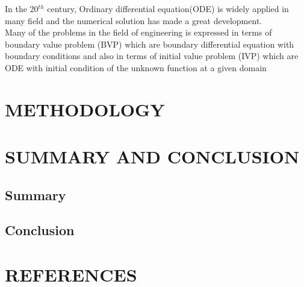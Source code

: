 \documentclass[11pt]{report}
\newcommand{\NI}{\noindent}
\begin{document}
	\NI In the 20$^{th}$ century, Ordinary differential equation(ODE) is widely applied in many field and the numerical solution has made a great development.\\
	
	\NI Many of the problems in the field of engineering is expressed in terms of boundary value problem (BVP) which are boundary differential equation with boundary conditions and also in terms of initial value problem (IVP) which are ODE with initial condition of the unknown function at a given domain 
	
	
	
	
	\chapter{METHODOLOGY}
	\section{}
	
	
	
	
	
	\chapter{}
	
	



	
	\chapter{SUMMARY AND CONCLUSION}
	\section{Summary}
	
	
	\section{Conclusion}
	
	

	
	\chapter*{REFERENCES}
	
	\begin{description}
		\item 
	\end{description}
	
\end{document}
